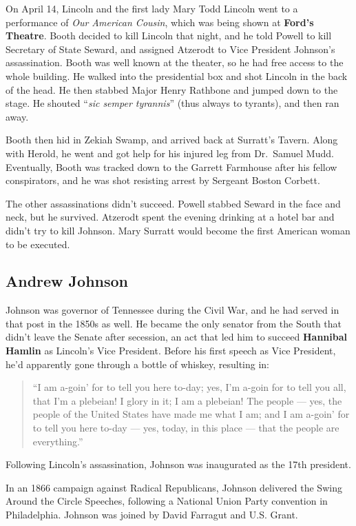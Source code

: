 On April 14, Lincoln and the first lady Mary Todd Lincoln went to a performance of \textit{Our American Cousin},
which was being shown at \textbf{Ford's Theatre}.
Booth decided to kill Lincoln that night, and he told Powell to kill Secretary of State Seward,
and assigned Atzerodt to Vice President Johnson's assassination.
Booth was well known at the theater, so he had free access to the whole building.
He walked into the presidential box and shot Lincoln in the back of the head.
He then stabbed Major Henry Rathbone and jumped down to the stage.
He shouted ``\textit{sic semper tyrannis}'' (thus always to tyrants), and then ran away.

Booth then hid in Zekiah Swamp, and arrived back at Surratt's Tavern.
Along with Herold, he went and got help for his injured leg from Dr.\ Samuel Mudd.
Eventually, Booth was tracked down to the Garrett Farmhouse after his fellow conspirators,
and he was shot resisting arrest by Sergeant Boston Corbett.

The other assassinations didn't succeed.
Powell stabbed Seward in the face and neck, but he survived.
Atzerodt spent the evening drinking at a hotel bar and didn't try to kill Johnson.
Mary Surratt would become the first American woman to be executed.

\subsection*{Andrew Johnson}

Johnson was governor of Tennessee during the Civil War, and he had served in that post in the 1850s as well.
He became the only senator from the South that didn't leave the Senate after secession,
an act that led him to succeed \textbf{Hannibal Hamlin} as Lincoln's Vice President.
Before his first speech as Vice President, he'd apparently gone through a bottle of whiskey, resulting in:

\begin{quotation}
  ``I am a-goin' for to tell you here to-day;
  yes, I'm a-goin for to tell you all, that I'm a plebeian!
  I glory in it; I am a plebeian!
  The people --- yes, the people of the United States have made me what I am;
  and I am a-goin' for to tell you here to-day --- yes, today, in this place --- that the people are everything.''
\end{quotation}

Following Lincoln's assassination, Johnson was inaugurated as the 17th president.

In an 1866 campaign against Radical Republicans,
Johnson delivered the Swing Around the Circle Speeches,
following a National Union Party convention in Philadelphia.
Johnson was joined by David Farragut and U.S. Grant.

